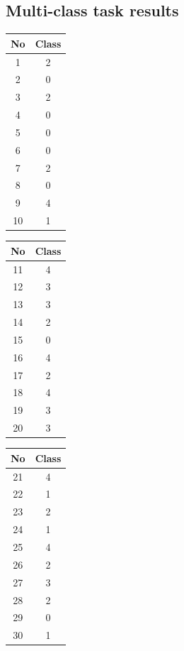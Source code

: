\documentclass[11pt]{article}
\begin{document}
		\subsection{Multi-class task results}


		\begin{center}
		  	\begin{table}[h]
		  		\small

		  	\centering
			\begin{tabular}[b]{| c | c|} 
				\hline
				No & Class \\
				\hline
				1 & 2 \\ 2 & 0 \\ 3 & 2 \\ 4 & 0 \\ 5 & 0 \\ 6 & 0 \\ 7 & 2 \\ 8 & 0 \\ 9 & 4 \\ 10 & 1\\ 
				\hline
			\end{tabular}
			\begin{tabular}[b]{| c | c|} 
				\hline
				No & Class \\
				\hline
				 11 & 4 \\ 12 & 3 \\ 13 &  3 \\ 14 &  2\\ 15 &  0\\ 16 & 4\\ 17 & 2\\ 18 &  4 \\ 19 &  3\\20 & 3 \\ 
				\hline
			\end{tabular}
			\begin{tabular}[b]{| c | c|} 
				\hline
				No & Class \\
				\hline
				 21 & 4 \\ 22 &  1 \\ 23 & 2 \\ 24 & 1 \\ 25 & 4 \\ 26 & 2 \\ 27 & 3 \\ 28 & 2 \\ 29 & 0 \\ 30 & 1 \\ 
				\hline
			\end{tabular}

\end{table}
\end{center}
\end{document}
